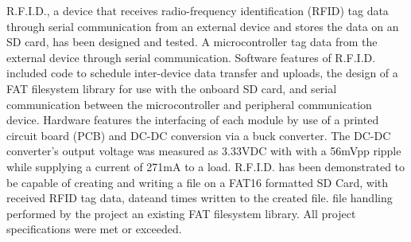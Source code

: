 R.F.I.D., a device that receives radio-frequency identification (RFID) tag data through serial communication from an external device and stores the data on an SD card, has been designed and tested. A microcontroller \DIFdelbegin {}\DIFdelend \DIFaddbegin {}\DIFaddend tag data from the external device through serial communication. Software features of R.F.I.D. included code to schedule inter-device data transfer and uploads, the design of a FAT filesystem library \DIFdelbegin {}\DIFdelend for use with the onboard SD card, and serial communication between the microcontroller and peripheral communication device. Hardware features \DIFdelbegin {}\DIFdelend \DIFaddbegin {}\DIFaddend the interfacing of each module by use of a printed circuit board (PCB) and DC-DC conversion via a buck converter. The DC-DC converter's output voltage was measured as 3.33VDC with with a 56mVpp ripple while supplying a current of 271mA to a load. R.F.I.D. has been demonstrated to be capable of creating and writing a file on a FAT16 formatted SD Card, with received RFID tag data, date\DIFaddbegin \DIFadd{, }\DIFaddend and times written to the created file. \DIFdelbegin {}\DIFdelend \DIFaddbegin {}\DIFaddend file handling performed by the project \DIFdelbegin {}\DIFdelend \DIFaddbegin {}\DIFaddend an existing FAT filesystem library. All project specifications were met or exceeded.





